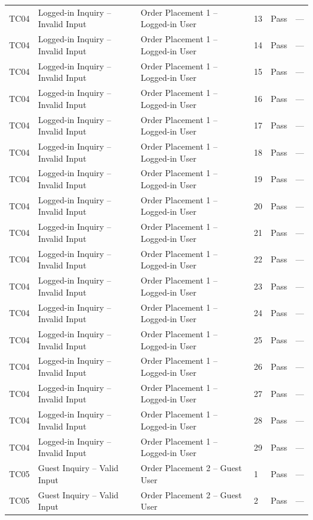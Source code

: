 {\begin{longtable}{@{}p{1.2cm} p{4.2cm} p{4.4cm} p{0.8cm} p{0.9cm} p{1.6cm}@{}}
  TC04 & Logged-in Inquiry -- Invalid Input & Order Placement 1 -- Logged-in User & 13 & Pass & --- \\
  TC04 & Logged-in Inquiry -- Invalid Input & Order Placement 1 -- Logged-in User & 14 & Pass & --- \\
  TC04 & Logged-in Inquiry -- Invalid Input & Order Placement 1 -- Logged-in User & 15 & Pass & --- \\
  TC04 & Logged-in Inquiry -- Invalid Input & Order Placement 1 -- Logged-in User & 16 & Pass & --- \\
  TC04 & Logged-in Inquiry -- Invalid Input & Order Placement 1 -- Logged-in User & 17 & Pass & --- \\
  TC04 & Logged-in Inquiry -- Invalid Input & Order Placement 1 -- Logged-in User & 18 & Pass & --- \\
  TC04 & Logged-in Inquiry -- Invalid Input & Order Placement 1 -- Logged-in User & 19 & Pass & --- \\
  TC04 & Logged-in Inquiry -- Invalid Input & Order Placement 1 -- Logged-in User & 20 & Pass & --- \\
  TC04 & Logged-in Inquiry -- Invalid Input & Order Placement 1 -- Logged-in User & 21 & Pass & --- \\
  TC04 & Logged-in Inquiry -- Invalid Input & Order Placement 1 -- Logged-in User & 22 & Pass & --- \\
  TC04 & Logged-in Inquiry -- Invalid Input & Order Placement 1 -- Logged-in User & 23 & Pass & --- \\
  TC04 & Logged-in Inquiry -- Invalid Input & Order Placement 1 -- Logged-in User & 24 & Pass & --- \\
  TC04 & Logged-in Inquiry -- Invalid Input & Order Placement 1 -- Logged-in User & 25 & Pass & --- \\
  TC04 & Logged-in Inquiry -- Invalid Input & Order Placement 1 -- Logged-in User & 26 & Pass & --- \\
  TC04 & Logged-in Inquiry -- Invalid Input & Order Placement 1 -- Logged-in User & 27 & Pass & --- \\
  TC04 & Logged-in Inquiry -- Invalid Input & Order Placement 1 -- Logged-in User & 28 & Pass & --- \\
  TC04 & Logged-in Inquiry -- Invalid Input & Order Placement 1 -- Logged-in User & 29 & Pass & --- \\
  \midrule
  TC05 & Guest Inquiry -- Valid Input & Order Placement 2 -- Guest User & 1 & Pass & --- \\
  TC05 & Guest Inquiry -- Valid Input & Order Placement 2 -- Guest User & 2 & Pass & --- \\

\end{longtable}}

